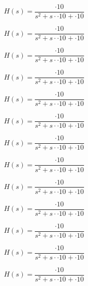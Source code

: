 \begin{equation}
H(s) = \frac{ \cdot 10^{}}{s^2 + s \cdot  \cdot 10^{} +  \cdot 10^{}}
\end{equation}

\begin{equation}
H(s) = \frac{ \cdot 10^{}}{s^2 + s \cdot  \cdot 10^{} +  \cdot 10^{}}
\end{equation}

\begin{equation}
H(s) = \frac{ \cdot 10^{}}{s^2 + s \cdot  \cdot 10^{} +  \cdot 10^{}}
\end{equation}

\begin{equation}
H(s) = \frac{ \cdot 10^{}}{s^2 + s \cdot  \cdot 10^{} +  \cdot 10^{}}
\end{equation}

\begin{equation}
H(s) = \frac{ \cdot 10^{}}{s^2 + s \cdot  \cdot 10^{} +  \cdot 10^{}}
\end{equation}

\begin{equation}
H(s) = \frac{ \cdot 10^{}}{s^2 + s \cdot  \cdot 10^{} +  \cdot 10^{}}
\end{equation}

\begin{equation}
H(s) = \frac{ \cdot 10^{}}{s^2 + s \cdot  \cdot 10^{} +  \cdot 10^{}}
\end{equation}

\begin{equation}
H(s) = \frac{ \cdot 10^{}}{s^2 + s \cdot  \cdot 10^{} +  \cdot 10^{}}
\end{equation}

\begin{equation}
H(s) = \frac{ \cdot 10^{}}{s^2 + s \cdot  \cdot 10^{} +  \cdot 10^{}}
\end{equation}

\begin{equation}
H(s) = \frac{ \cdot 10^{}}{s^2 + s \cdot  \cdot 10^{} +  \cdot 10^{}}
\end{equation}

\begin{equation}
H(s) = \frac{ \cdot 10^{}}{s^2 + s \cdot  \cdot 10^{} +  \cdot 10^{}}
\end{equation}

\begin{equation}
H(s) = \frac{ \cdot 10^{}}{s^2 + s \cdot  \cdot 10^{} +  \cdot 10^{}}
\end{equation}

\begin{equation}
H(s) = \frac{ \cdot 10^{}}{s^2 + s \cdot  \cdot 10^{} +  \cdot 10^{}}
\end{equation}
